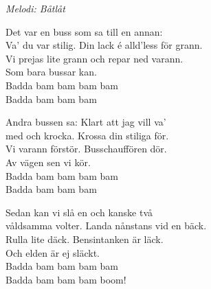 {\footnotesize\textit{Melodi: Båtlåt}}\par
\vspace{10pt}
Det var en buss som sa till en annan:\\
Va' du var stilig. Din lack é alld'less för grann.\\
Vi prejas lite grann och repar ned varann.\\
Som bara bussar kan.\\
Badda bam bam bam bam\\
Badda bam bam bam\par
\vspace{10pt}
Andra bussen sa: Klart att jag vill va'\\
med och krocka. Krossa din stiliga för.\\
Vi varann förstör. Busschauffören dör.\\
Av vägen sen vi kör.\\
Badda bam bam bam bam\\
Badda bam bam bam\par
\vspace{10pt}
Sedan kan vi slå en och kanske två\\
våldsamma volter. Landa nånstans vid en bäck.\\
Rulla lite däck. Bensintanken är läck.\\
Och elden är ej släckt.\\
Badda bam bam bam bam\\
Badda bam bam bam boom!
